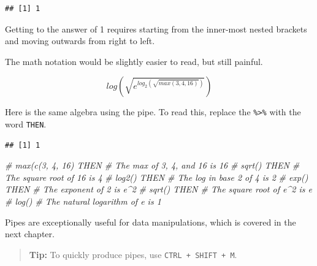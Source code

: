 \documentclass[openany]{book}
\newenvironment{Shaded}{\begin{snugshade}}{\end{snugshade}}
\newcommand{\CommentTok}[1]{\textcolor[rgb]{0.56,0.35,0.01}{\textit{#1}}}
\newcommand{\DecValTok}[1]{\textcolor[rgb]{0.00,0.00,0.81}{#1}}
\newcommand{\KeywordTok}[1]{\textcolor[rgb]{0.13,0.29,0.53}{\textbf{#1}}}
\newcommand{\NormalTok}[1]{#1}
\newcommand{\OperatorTok}[1]{\textcolor[rgb]{0.81,0.36,0.00}{\textbf{#1}}}
\newcommand{\StringTok}[1]{\textcolor[rgb]{0.31,0.60,0.02}{#1}}
\begin{document}
\begin{verbatim}
## [1] 1
\end{verbatim}

Getting to the answer of 1 requires starting from the inner-most nested brackets
and moving outwards from right to left.

The math notation would be slightly easier to read, but still painful.

\[log(\sqrt{e^{log_2(\sqrt{max(3,4,16)})}})\]

Here is the same algebra using the pipe. To read this, replace the \texttt{\%\textgreater{}\%} with
the word \texttt{THEN}.

\begin{Shaded}
\end{Shaded}

\begin{verbatim}
## [1] 1
\end{verbatim}

\begin{Shaded}
\begin{Highlighting}[]
\CommentTok{# max(c(3, 4, 16) THEN  # The max of 3, 4, and 16 is 16}
\CommentTok{#  sqrt() THEN          # The square root of 16 is 4}
\CommentTok{#  log2() THEN          # The log in base 2 of 4 is 2}
\CommentTok{#  exp() THEN           # The exponent of 2 is e^2}
\CommentTok{#  sqrt() THEN          # The square root of e^2 is e}
\CommentTok{#  log()                # The natural logarithm of e is 1}
\end{Highlighting}
\end{Shaded}

Pipes are exceptionally useful for data manipulations, which is covered in the
next chapter.

\begin{quote}
\textbf{Tip:} To quickly produce pipes, use \texttt{CTRL\ +\ SHIFT\ +\ M}.
\end{quote}
\end{document}
